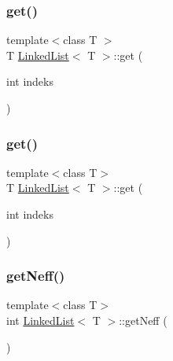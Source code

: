 \mbox{\label{classLinkedList_a0f812c8aa5443a800c4e3c4bcb5542fa}} 
\subsubsection{\texorpdfstring{get()}{get()}\hspace{0.1cm}{\footnotesize\ttfamily [1/2]}}
{\footnotesize\ttfamily template$<$class T $>$ \\
T \mbox{\hyperlink{classLinkedList}{Linked\+List}}$<$ T $>$\+::get (\begin{DoxyParamCaption}\item[{int}]{indeks }\end{DoxyParamCaption})}

\mbox{\label{classLinkedList_a0f812c8aa5443a800c4e3c4bcb5542fa}} 
\subsubsection{\texorpdfstring{get()}{get()}\hspace{0.1cm}{\footnotesize\ttfamily [2/2]}}
{\footnotesize\ttfamily template$<$class T$>$ \\
T \mbox{\hyperlink{classLinkedList}{Linked\+List}}$<$ T $>$\+::get (\begin{DoxyParamCaption}\item[{int}]{indeks }\end{DoxyParamCaption})}

\mbox{\label{classLinkedList_a0f1bf5709295784ae18271b88af50f88}} 
\subsubsection{\texorpdfstring{getNeff()}{getNeff()}\hspace{0.1cm}{\footnotesize\ttfamily [1/2]}}
{\footnotesize\ttfamily template$<$class T$>$ \\
int \mbox{\hyperlink{classLinkedList}{Linked\+List}}$<$ T $>$\+::get\+Neff (\begin{DoxyParamCaption}{ }\end{DoxyParamCaption})}

